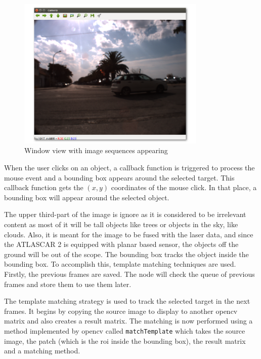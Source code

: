 \begin{figure}[htp]
	
	\centering
	\includegraphics[width=0.8\textwidth]{caplabel/imgs/view.png}
	
	\caption{Window view with image sequences appearing}
	\label{fig:view}
	
\end{figure}

When the user clicks on an object, a callback function is triggered to process the mouse event and a bounding box appears around the selected target. This callback function gets the $(x,y)$ coordinates of the mouse click. In that place, a bounding box will appear around the selected object.

The upper third-part of the image is ignore as it is considered to be irrelevant content as most of it will be tall objects like trees or objects in the sky, like clouds. Also, it is meant for the image to be fused with the laser data, and since the ATLASCAR 2 is equipped with planar based sensor, the objects off the ground will be out of the scope. The bounding box tracks the object inside the bounding box. To accomplish this, template matching techniques are used. Firstly, the previous frames are saved. The node will check the queue of previous frames and store them to use them later. 

The template matching strategy is used to track the selected target in the next frames. It begins by copying the source image to display to another \gls{opencv} matrix and also creates a result matrix. The matching is now performed using a method implemented by \gls{opencv} called \texttt{matchTemplate} which takes the source image, the patch (which is the \gls{roi} inside the bounding box), the result matrix and a matching method. 

